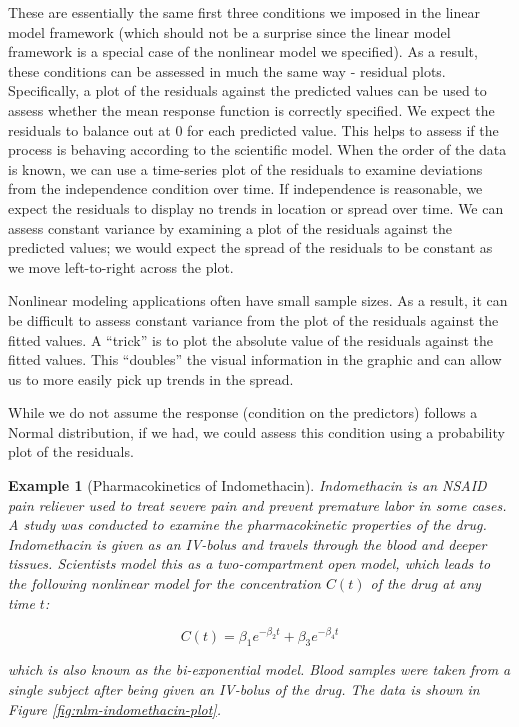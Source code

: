 \documentclass[
]{book}
\theoremstyle{plain}
\theoremstyle{mydefn}
\theoremstyle{myexmpl}
\newtheorem{example}{Example}[chapter]
\theoremstyle{remark}
\begin{document}
These are essentially the same first three conditions we imposed in the linear model framework (which should not be a surprise since the linear model framework is a special case of the nonlinear model we specified). As a result, these conditions can be assessed in much the same way - residual plots. Specifically, a plot of the residuals against the predicted values can be used to assess whether the mean response function is correctly specified. We expect the residuals to balance out at 0 for each predicted value. This helps to assess if the process is behaving according to the scientific model. When the order of the data is known, we can use a time-series plot of the residuals to examine deviations from the independence condition over time. If independence is reasonable, we expect the residuals to display no trends in location or spread over time. We can assess constant variance by examining a plot of the residuals against the predicted values; we would expect the spread of the residuals to be constant as we move left-to-right across the plot.

\begin{rmdtip}
Nonlinear modeling applications often have small sample sizes. As a result, it can be difficult to assess constant variance from the plot of the residuals against the fitted values. A ``trick'' is to plot the absolute value of the residuals against the fitted values. This ``doubles'' the visual information in the graphic and can allow us to more easily pick up trends in the spread.
\end{rmdtip}

While we do not assume the response (condition on the predictors) follows a Normal distribution, if we had, we could assess this condition using a probability plot of the residuals.

\begin{example}[Pharmacokinetics of Indomethacin]
\protect\hypertarget{exm:nlm-indomethacin}{}{\label{exm:nlm-indomethacin} {} }Indomethacin is an NSAID pain reliever used to treat severe pain and prevent premature labor in some cases. A study was conducted to examine the pharmacokinetic properties of the drug. Indomethacin is given as an IV-bolus and travels through the blood and deeper tissues. Scientists model this as a two-compartment open model, which leads to the following nonlinear model for the concentration \(C(t)\) of the drug at any time \(t\):

\[C(t) = \beta_1 e^{-\beta_2 t} + \beta_3 e^{-\beta_4 t}\]

which is also known as the bi-exponential model. Blood samples were taken from a single subject after being given an IV-bolus of the drug. The data is shown in Figure \ref{fig:nlm-indomethacin-plot}.
\end{example}
\end{document}
